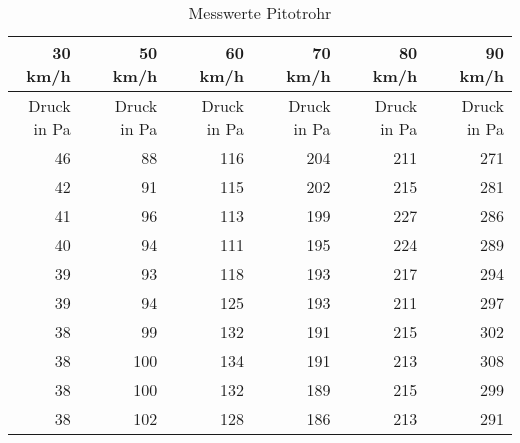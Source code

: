 \begin{table}[htbp]
  \centering
  \caption{Messwerte Pitotrohr}
    \begin{tabular}{rrrrrrrrrrr}
    \toprule
    30 km/h &       & 50 km/h &       & 60 km/h &       & 70 km/h &       & 80 km/h &       & 90 km/h \\
    \midrule
    Druck in Pa &       & Druck in Pa &       & Druck in Pa &       & Druck in Pa &       & Druck in Pa &       & Druck in Pa \\
    46    &       & 88    &       & 116   &       & 204   &       & 211   &       & 271 \\
    42    &       & 91    &       & 115   &       & 202   &       & 215   &       & 281 \\
    41    &       & 96    &       & 113   &       & 199   &       & 227   &       & 286 \\
    40    &       & 94    &       & 111   &       & 195   &       & 224   &       & 289 \\
    39    &       & 93    &       & 118   &       & 193   &       & 217   &       & 294 \\
    39    &       & 94    &       & 125   &       & 193   &       & 211   &       & 297 \\
    38    &       & 99    &       & 132   &       & 191   &       & 215   &       & 302 \\
    38    &       & 100   &       & 134   &       & 191   &       & 213   &       & 308 \\
    38    &       & 100   &       & 132   &       & 189   &       & 215   &       & 299 \\
    38    &       & 102   &       & 128   &       & 186   &       & 213   &       & 291 \\
    \bottomrule
    \end{tabular}%
  \label{tab:Pitotrohr}%
\end{table}%

